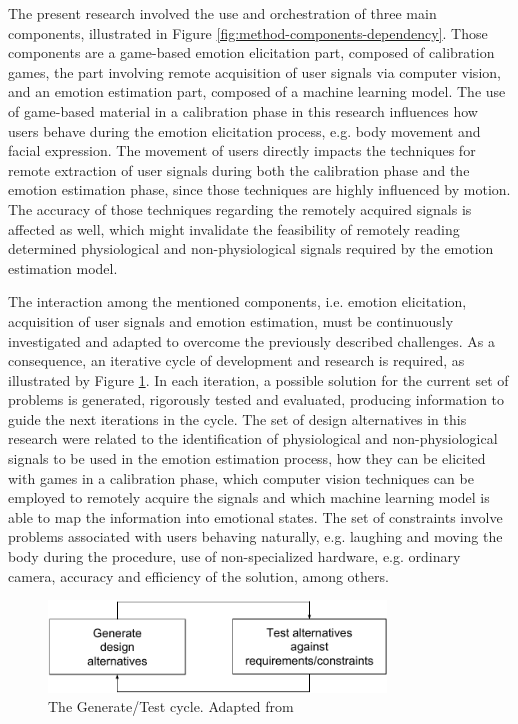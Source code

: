 The present research involved the use and orchestration of three main components, illustrated in Figure \ref{fig:method-components-dependency}. Those components are a game-based emotion elicitation part, composed of calibration games, the part involving remote acquisition of user signals via computer vision, and an emotion estimation part, composed of a machine learning model. The use of game-based material in a calibration phase in this research influences how users behave during the emotion elicitation process, e.g. body movement and facial expression. The movement of users directly impacts the techniques for remote extraction of user signals during both the calibration phase and the emotion estimation phase, since those techniques are highly influenced by motion. The accuracy of those techniques regarding the remotely acquired signals is affected as well, which might invalidate the feasibility of remotely reading determined physiological and non-physiological signals required by the emotion estimation model.

The interaction among the mentioned components, i.e. emotion elicitation, acquisition of user signals and emotion estimation, must be continuously investigated and adapted to overcome the previously described challenges. As a consequence, an iterative cycle of development and research is required, as illustrated by Figure \ref{fig:hevner-generate-test}. In each iteration, a possible solution for the current set of problems is generated, rigorously tested and evaluated, producing information to guide the next iterations in the cycle. The set of design alternatives in this research were related to the identification of physiological and non-physiological signals to be used in the emotion estimation process, how they can be elicited with games in a calibration phase, which computer vision techniques can be employed to remotely acquire the signals and which machine learning model is able to map the information into emotional states. The set of constraints involve problems associated with users behaving naturally, e.g. laughing and moving the body during the procedure, use of non-specialized hardware, e.g. ordinary camera, accuracy and efficiency of the solution, among others.

\begin{figure}[h]
    \centering
    \includegraphics[width=0.8\textwidth]{Content/figures/hevner-generate-test}
    \caption{The Generate/Test cycle. Adapted from \textcite{hevner2004design}}
    \label{fig:hevner-generate-test}
\end{figure}

